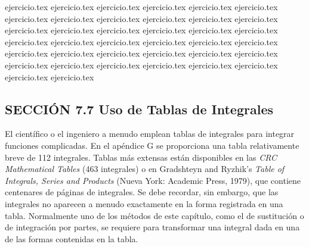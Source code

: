 \vspace{0.5cm}
\begin{enumerate}
    \setcounter{enumi}{42}
    {ejercicio.tex}
{ejercicio.tex}
{ejercicio.tex}
{ejercicio.tex}
{ejercicio.tex}
{ejercicio.tex}
{ejercicio.tex}
{ejercicio.tex}
{ejercicio.tex}
{ejercicio.tex}
{ejercicio.tex}
{ejercicio.tex}
{ejercicio.tex}
{ejercicio.tex}
{ejercicio.tex}
{ejercicio.tex}
{ejercicio.tex}
{ejercicio.tex}
{ejercicio.tex}
{ejercicio.tex}
{ejercicio.tex}
{ejercicio.tex}
{ejercicio.tex}
{ejercicio.tex}
{ejercicio.tex}
{ejercicio.tex}
{ejercicio.tex}
{ejercicio.tex}
{ejercicio.tex}
{ejercicio.tex}
{ejercicio.tex}
{ejercicio.tex}
{ejercicio.tex}
{ejercicio.tex}
{ejercicio.tex}
{ejercicio.tex}
{ejercicio.tex}
{ejercicio.tex}
\end{enumerate}

\vspace{0.8cm}
\subsection*{SECCIÓN 7.7 \quad Uso de Tablas de Integrales}

El científico o el ingeniero a menudo emplean tablas de integrales para integrar funciones complicadas. En el apéndice G se proporciona una tabla relativamente breve de 112 integrales. Tablas más extensas están disponibles en las \textit{CRC Mathematical Tables} (463 integrales) o en Gradshteyn and Ryzhik's \textit{Table of Integrals, Series and Products} (Nueva York: Academic Press, 1979), que contiene centenares de páginas de integrales. Se debe recordar, sin embargo, que las integrales no aparecen a menudo exactamente en la forma registrada en una tabla. Normalmente uno de los métodos de este capítulo, como el de sustitución o de integración por partes, se requiere para transformar una integral dada en una de las formas contenidas en la tabla.
